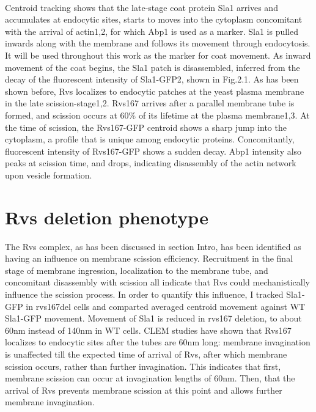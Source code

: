 \mbox{}\\
Centroid tracking shows that the late-stage coat protein Sla1 arrives and accumulates at endocytic sites, starts to moves into the cytoplasm concomitant with the arrival of actin1,2, for which Abp1 is used as a marker. Sla1 is pulled inwards along with the membrane and follows its movement through endocytosis. It will be used throughout this work as the marker for coat movement. As inward movement of the coat begins, the Sla1 patch is disassembled, inferred from the decay of the fluorescent intensity of Sla1-GFP2, shown in Fig.2.1. As has been shown before, Rvs localizes to endocytic patches at the yeast plasma membrane in the late scission-stage1,2. Rvs167 arrives after a parallel membrane tube is formed, and scission occurs at 60\% of its lifetime at the plasma membrane1,3. At the time of scission, the Rvs167-GFP centroid shows a sharp jump into the cytoplasm, a profile that is unique among endocytic proteins. Concomitantly, fluorescent intensity of Rvs167-GFP shows a sudden decay. Abp1 intensity also peaks at scission time, and drops, indicating disassembly of the actin network upon vesicle formation. 



\section{Rvs deletion phenotype}
The Rvs complex, as has been discussed in section {Intro}, has been identified as having an influence on membrane scission efficiency. Recruitment in the final stage of membrane ingression, localization to the membrane tube, and concomitant disassembly with scission all indicate that Rvs could mechanistically influence the scission process. In order to quantify this influence, I tracked Sla1-GFP in rvs167del cells and comparted averaged centroid movement against WT Sla1-GFP movement. Movement of Sla1 is reduced in rvs167 deletion, to about 60nm instead of 140nm in WT cells. CLEM studies have shown that Rvs167 localizes to endocytic sites after the tubes are 60nm long: membrane invagination is unaffected till the expected time of arrival of Rvs, after which membrane scission occurs, rather than further invagination. This indicates that first, membrane scission can occur at invagination lengths of 60nm. Then, that the arrival of Rvs prevents membrane scission at this point and allows further membrane invagination. 

